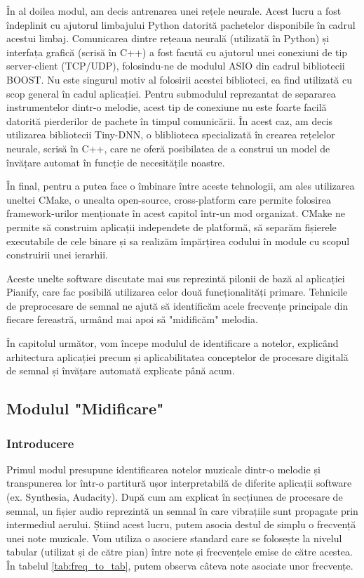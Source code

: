 \documentclass[a4paper,12pt]{report}
\begin{document}
  	În al doilea modul, am decis antrenarea unei rețele neurale. Acest lucru a fost îndeplinit cu ajutorul limbajului Python datorită pachetelor disponibile în cadrul acestui limbaj. Comunicarea dintre rețeaua neurală (utilizată în Python) și interfața grafică (scrisă în C++) a fost facută cu ajutorul unei conexiuni de tip server-client (TCP/UDP), folosindu-ne de modulul ASIO din cadrul bibliotecii BOOST. Nu este singurul motiv al folosirii acestei biblioteci, ea find utilizată cu scop general în cadul aplicației. Pentru submodulul reprezantat de separarea instrumentelor dintr-o melodie, acest tip de conexiune nu este foarte facilă datorită pierderilor de pachete în timpul comunicării. În acest caz, am decis utilizarea bibliotecii Tiny-DNN, o bliblioteca specializată în crearea rețelelor neurale, scrisă în C++, care ne oferă posibilatea de a construi un model de învățare automat în funcție de necesitățile noastre. 
  	
  	În final, pentru a putea face o îmbinare între aceste tehnologii, am ales utilizarea uneltei CMake, o unealta open-source, cross-platform care permite folosirea framework-urilor menționate în acest capitol într-un mod organizat. CMake ne permite să construim aplicații independete de platformă, să separăm fișierele executabile de cele binare și sa realizăm împărțirea codului în module cu scopul construirii unei ierarhii. 
  	
  	Aceste unelte software discutate mai sus reprezintă pilonii de bază al aplicației Pianify, care fac posibilă utilizarea celor două funcționalități primare. Tehnicile de preprocesare de semnal ne ajută să identificăm acele frecvențe principale din fiecare fereastră, urmând mai apoi să "midificăm" melodia. 
  	
  	În capitolul următor, vom începe modulul de identificare a notelor, explicând arhitectura aplicației precum și aplicabilitatea conceptelor de procesare digitală de semnal și învățare automată explicate până acum.
  	
  	\clearpage	
  	\subsection{Modulul "Midificare"}
  	\subsubsection{Introducere}
   	Primul modul presupune identificarea notelor muzicale dintr-o melodie și transpunerea lor într-o partitură ușor interpretabilă de diferite aplicații software (ex. Synthesia, Audacity). După cum am explicat în secțiunea de procesare de semnal, un fișier audio reprezintă un semnal în care vibrațiile sunt propagate prin intermediul aerului. Știind acest lucru, putem asocia destul de simplu o frecvență unei note muzicale. Vom utiliza o asociere standard care se folosește la nivelul tabular (utilizat și de către pian) între note și frecvențele emise de către acestea. În tabelul \ref{tab:freq_to_tab}, putem observa câteva note asociate unor frecvențe.    
   	
\end{document}
